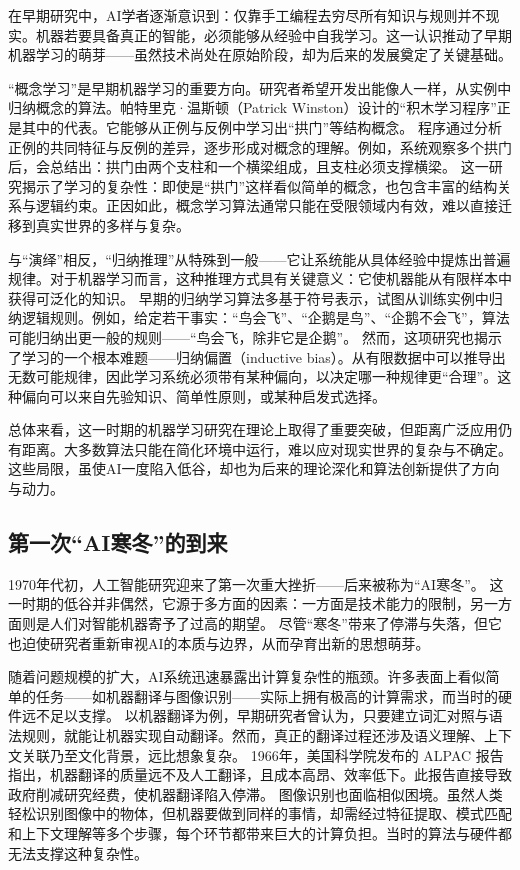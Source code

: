 在早期研究中，AI学者逐渐意识到：仅靠手工编程去穷尽所有知识与规则并不现实。机器若要具备真正的智能，必须能够从经验中自我学习。这一认识推动了早期机器学习的萌芽——虽然技术尚处在原始阶段，却为后来的发展奠定了关键基础。

“概念学习”是早期机器学习的重要方向。研究者希望开发出能像人一样，从实例中归纳概念的算法。帕特里克·温斯顿（Patrick Winston）设计的“积木学习程序”正是其中的代表。它能够从正例与反例中学习出“拱门”等结构概念。  
程序通过分析正例的共同特征与反例的差异，逐步形成对概念的理解。例如，系统观察多个拱门后，会总结出：拱门由两个支柱和一个横梁组成，且支柱必须支撑横梁。  
这一研究揭示了学习的复杂性：即使是“拱门”这样看似简单的概念，也包含丰富的结构关系与逻辑约束。正因如此，概念学习算法通常只能在受限领域内有效，难以直接迁移到真实世界的多样与复杂。

与“演绎”相反，“归纳推理”从特殊到一般——它让系统能从具体经验中提炼出普遍规律。对于机器学习而言，这种推理方式具有关键意义：它使机器能从有限样本中获得可泛化的知识。  
早期的归纳学习算法多基于符号表示，试图从训练实例中归纳逻辑规则。例如，给定若干事实：“鸟会飞”、“企鹅是鸟”、“企鹅不会飞”，算法可能归纳出更一般的规则——“鸟会飞，除非它是企鹅”。  
然而，这项研究也揭示了学习的一个根本难题——归纳偏置（inductive bias）。从有限数据中可以推导出无数可能规律，因此学习系统必须带有某种偏向，以决定哪一种规律更“合理”。这种偏向可以来自先验知识、简单性原则，或某种启发式选择。

总体来看，这一时期的机器学习研究在理论上取得了重要突破，但距离广泛应用仍有距离。大多数算法只能在简化环境中运行，难以应对现实世界的复杂与不确定。这些局限，虽使AI一度陷入低谷，却也为后来的理论深化和算法创新提供了方向与动力。

\subsection{第一次“AI寒冬”的到来}

1970年代初，人工智能研究迎来了第一次重大挫折——后来被称为“AI寒冬”。  
这一时期的低谷并非偶然，它源于多方面的因素：一方面是技术能力的限制，另一方面则是人们对智能机器寄予了过高的期望。  
尽管“寒冬”带来了停滞与失落，但它也迫使研究者重新审视AI的本质与边界，从而孕育出新的思想萌芽。

随着问题规模的扩大，AI系统迅速暴露出计算复杂性的瓶颈。许多表面上看似简单的任务——如机器翻译与图像识别——实际上拥有极高的计算需求，而当时的硬件远不足以支撑。  
以机器翻译为例，早期研究者曾认为，只要建立词汇对照与语法规则，就能让机器实现自动翻译。然而，真正的翻译过程还涉及语义理解、上下文关联乃至文化背景，远比想象复杂。  
1966年，美国科学院发布的 ALPAC 报告指出，机器翻译的质量远不及人工翻译，且成本高昂、效率低下。此报告直接导致政府削减研究经费，使机器翻译陷入停滞。  
图像识别也面临相似困境。虽然人类轻松识别图像中的物体，但机器要做到同样的事情，却需经过特征提取、模式匹配和上下文理解等多个步骤，每个环节都带来巨大的计算负担。当时的算法与硬件都无法支撑这种复杂性。


